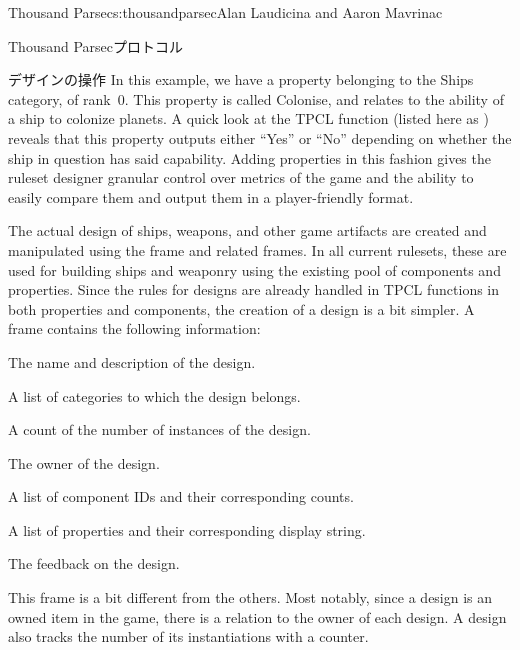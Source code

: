 \begin{aosachapter}{Thousand Parsec}{s:thousandparsec}{Alan Laudicina and Aaron Mavrinac}
\begin{aosasect1}{Thousand Parsecプロトコル}
\begin{aosasect2}{デザインの操作}
In this example, we have a property belonging to the Ships category,
of rank~0. This property is called Colonise, and relates to the
ability of a ship to colonize planets. A quick look at the TPCL
 function (listed here as )
reveals that this property outputs either ``Yes'' or ``No'' depending
on whether the ship in question has said capability. Adding properties
in this fashion gives the ruleset designer granular control over
metrics of the game and the ability to easily compare them and output
them in a player-friendly format.

The actual design of ships, weapons, and other game artifacts are
created and manipulated using the  frame and related
frames. In all current rulesets, these are used for building ships and
weaponry using the existing pool of components and properties. Since
the rules for designs are already handled in TPCL 
functions in both properties and components, the creation of a design
is a bit simpler. A  frame contains the following
information:

\begin{aosaitemize}

  \item The name and description of the design.

  \item A list of categories to which the design belongs.

  \item A count of the number of instances of the design.

  \item The owner of the design.

  \item A list of component IDs and their corresponding counts.

  \item A list of properties and their corresponding display string.

  \item The feedback on the design.

\end{aosaitemize}

This frame is a bit different from the others. Most notably, since a
design is an owned item in the game, there is a relation to the owner
of each design. A design also tracks the number of its instantiations
with a counter.

\end{aosasect2}


\end{aosasect1}
\end{aosachapter}

